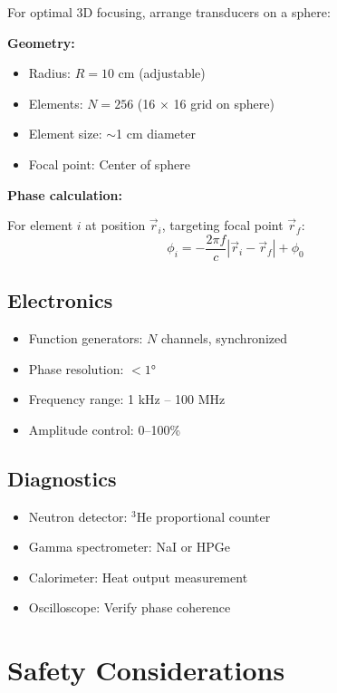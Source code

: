 \documentclass[12pt,a4paper]{article}
\begin{document}
For optimal 3D focusing, arrange transducers on a sphere:

\textbf{Geometry:}
\begin{itemize}
    \item Radius: $R = 10$ cm (adjustable)
    \item Elements: $N = 256$ (16 $\times$ 16 grid on sphere)
    \item Element size: $\sim$1 cm diameter
    \item Focal point: Center of sphere
\end{itemize}

\textbf{Phase calculation:}

For element $i$ at position $\vec{r}_i$, targeting focal point $\vec{r}_f$:
\begin{equation}
\phi_i = -\frac{2\pi f}{c}|\vec{r}_i - \vec{r}_f| + \phi_0
\end{equation}

\subsection{Electronics}

\begin{itemize}
    \item Function generators: $N$ channels, synchronized
    \item Phase resolution: $<1°$
    \item Frequency range: 1 kHz -- 100 MHz
    \item Amplitude control: 0--100\%
\end{itemize}

\subsection{Diagnostics}

\begin{itemize}
    \item Neutron detector: $^3$He proportional counter
    \item Gamma spectrometer: NaI or HPGe
    \item Calorimeter: Heat output measurement
    \item Oscilloscope: Verify phase coherence
\end{itemize}

\section{Safety Considerations}
\end{document}
